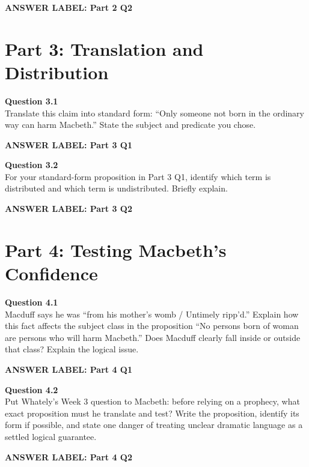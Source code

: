 \documentclass[12pt]{article}
\newcommand{\answerbox}[2]{%
\vspace{0.12em}
\noindent\textbf{#1}\par
\vspace{0.04em}
\noindent\fbox{%
\begin{minipage}[t][#2]{\dimexpr\textwidth-2\fboxsep-2\fboxrule}
\rule{\textwidth}{0pt}
\vspace{#2}
\end{minipage}}
\par\vspace{0.22em}}
\begin{document}
\answerbox{ANSWER LABEL: Part 2 Q2}{2.45in}

\newpage

\section*{Part 3: Translation and Distribution}

\textbf{Question 3.1}\\[-0.15em]
Translate this claim into standard form: ``Only someone not born in the ordinary way can harm Macbeth.'' State the subject and predicate you chose.

\answerbox{ANSWER LABEL: Part 3 Q1}{2.35in}

\textbf{Question 3.2}\\[-0.15em]
For your standard-form proposition in Part 3 Q1, identify which term is distributed and which term is undistributed. Briefly explain.

\answerbox{ANSWER LABEL: Part 3 Q2}{2.35in}

\newpage

\section*{Part 4: Testing Macbeth's Confidence}

\textbf{Question 4.1}\\[-0.15em]
Macduff says he was ``from his mother's womb / Untimely ripp'd.'' Explain how this fact affects the subject class in the proposition ``No persons born of woman are persons who will harm Macbeth.'' Does Macduff clearly fall inside or outside that class? Explain the logical issue.

\answerbox{ANSWER LABEL: Part 4 Q1}{2.55in}

\textbf{Question 4.2}\\[-0.15em]
Put Whately's Week 3 question to Macbeth: before relying on a prophecy, what exact proposition must he translate and test? Write the proposition, identify its form if possible, and state one danger of treating unclear dramatic language as a settled logical guarantee.

\answerbox{ANSWER LABEL: Part 4 Q2}{2.55in}
\end{document}
